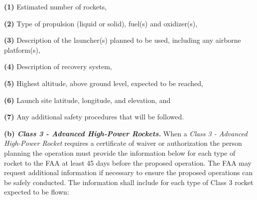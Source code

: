 \begin{adjustwidth}{0.5in}{0.0in}
\textbf{(1)} Estimated number of rockets,\par

\end{adjustwidth}

\begin{adjustwidth}{0.5in}{0.0in}
\textbf{(2)} Type of propulsion (liquid or solid), fuel(s) and oxidizer(s),\par

\end{adjustwidth}

\begin{adjustwidth}{0.5in}{0.0in}
\textbf{(3)} Description of the launcher(s) planned to be used, including any airborne platform(s),\par

\end{adjustwidth}

\begin{adjustwidth}{0.5in}{0.0in}
\textbf{(4)} Description of recovery system,\par

\end{adjustwidth}

\begin{adjustwidth}{0.5in}{0.0in}
\textbf{(5)} Highest altitude, above ground level, expected to be reached,\par

\end{adjustwidth}

\begin{adjustwidth}{0.5in}{0.0in}
\textbf{(6)} Launch site latitude, longitude, and elevation, and\par

\end{adjustwidth}

\begin{adjustwidth}{0.5in}{0.0in}
\textbf{(7)} Any additional safety procedures that will be followed.\par

\end{adjustwidth}

\textbf{(b)\textit{ Class 3 - Advanced High-Power Rockets.}} When a \textit{Class 3 - Advanced High-Power Rocket} requires a certificate of waiver or authorization the person planning the operation must provide the information below for each type of rocket to the FAA at least 45 days before the proposed operation. The FAA may request additional information if necessary to ensure the proposed operations can be safely conducted. The information shall include for each type of Class 3 rocket expected to be flown:\par

